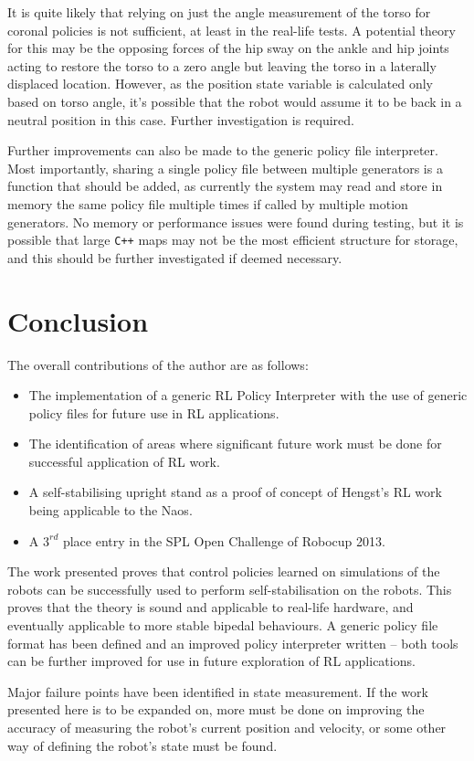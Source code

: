 It is quite likely that relying on just the angle measurement of the torso for coronal policies is not sufficient, at least in the real-life tests. A potential theory for this may be the opposing forces of the hip sway on the ankle and hip joints acting to restore the torso to a zero angle but leaving the torso in a laterally displaced location. However, as the position state variable is calculated only based on torso angle, it's possible that the robot would assume it to be back in a neutral position in this case. Further investigation is required.

Further improvements can also be made to the generic policy file interpreter. Most importantly, sharing a single policy file between multiple generators is a function that should be added, as currently the system may read and store in memory the same policy file multiple times if called by multiple motion generators. No memory or performance issues were found during testing, but it is possible that large \verb!C++! maps may not be the most efficient structure for storage, and this should be further investigated if deemed necessary.

\section{Conclusion}
The overall contributions of the author are as follows:
\begin{itemize}
\item The implementation of a generic RL Policy Interpreter with the use of generic policy files for future use in RL applications.
\item The identification of areas where significant future work must be done for successful application of RL work.
\item A self-stabilising upright stand as a proof of concept of Hengst's RL work being applicable to the Naos.
\item A $3^{rd}$ place entry in the SPL Open Challenge of Robocup 2013.
\end{itemize}

The work presented proves that control policies learned on simulations of the robots can be successfully used to perform self-stabilisation on the robots. This proves that the theory is sound and applicable to real-life hardware, and eventually applicable to more stable bipedal behaviours. A generic policy file format has been defined and an improved policy interpreter written -- both tools can be further improved for use in future exploration of RL applications.

Major failure points have been identified in state measurement. If the work presented here is to be expanded on, more must be done on improving the accuracy of measuring the robot's current position and velocity, or some other way of defining the robot's state must be found.
